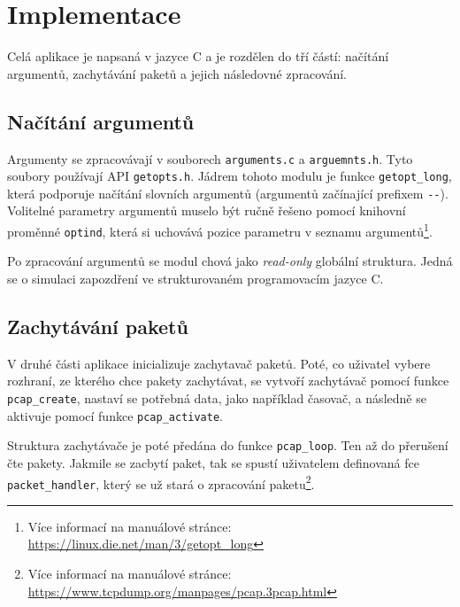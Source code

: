 \documentclass[a4paper,11pt]{article}
\begin{document}
    \section{Implementace}
    Celá aplikace je napsaná v jazyce C a je rozdělen do tří částí: načítání argumentů, zachytávání paketů a jejich následovné zpracování.

    \subsection{Načítání argumentů}
    Argumenty se zpracovávají v souborech \verb|arguments.c| a \verb|arguemnts.h|. Tyto soubory používají API \verb|getopts.h|.
    Jádrem tohoto modulu je funkce \verb|getopt_long|, která podporuje načítání slovních argumentů (argumentů začínající prefixem \verb|--|).
    Volitelné parametry argumentů muselo být ručně řešeno pomocí knihovní proměnné \verb|optind|, která si uchovává pozice parametru v seznamu argumentů\footnote{Více informací na manuálové stránce: \url{https://linux.die.net/man/3/getopt_long}}.

    Po zpracování argumentů se modul chová jako \emph{read-only} globální struktura. Jedná se o simulaci zapozdření ve strukturovaném programovacím jazyce C.

    \subsection{Zachytávání paketů}
    V druhé části aplikace inicializuje zachytavač paketů. Poté, co uživatel vybere rozhraní, ze kterého chce pakety zachytávat,
    se vytvoří zachytávač pomocí funkce \verb|pcap_create|, nastaví se potřebná data, jako například časovač, a následně se aktivuje pomocí funkce \verb|pcap_activate|.

    Struktura zachytávače je poté předána do funkce \verb|pcap_loop|. Ten až do přerušení čte pakety. Jakmile se zacbytí paket, tak se spustí
    uživatelem definovaná fce \verb|packet_handler|, který se už stará o zpracování paketu\footnote{Více informací na manuálové stránce: \url{https://www.tcpdump.org/manpages/pcap.3pcap.html}}.

    \newpage
\end{document}
